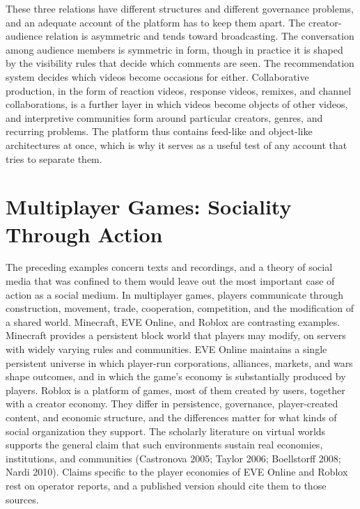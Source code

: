 \documentclass[11pt]{article}
\theoremstyle{remark}
\begin{document}
These three relations have different structures and different governance problems, and an adequate account of the platform has to keep them apart. The creator-audience relation is asymmetric and tends toward broadcasting. The conversation among audience members is symmetric in form, though in practice it is shaped by the visibility rules that decide which comments are seen. The recommendation system decides which videos become occasions for either. Collaborative production, in the form of reaction videos, response videos, remixes, and channel collaborations, is a further layer in which videos become objects of other videos, and interpretive communities form around particular creators, genres, and recurring problems. The platform thus contains feed-like and object-like architectures at once, which is why it serves as a useful test of any account that tries to separate them.

\section{Multiplayer Games: Sociality Through Action}

The preceding examples concern texts and recordings, and a theory of social media that was confined to them would leave out the most important case of action as a social medium. In multiplayer games, players communicate through construction, movement, trade, cooperation, competition, and the modification of a shared world. Minecraft, EVE Online, and Roblox are contrasting examples. Minecraft provides a persistent block world that players may modify, on servers with widely varying rules and communities. EVE Online maintains a single persistent universe in which player-run corporations, alliances, markets, and wars shape outcomes, and in which the game's economy is substantially produced by players. Roblox is a platform of games, most of them created by users, together with a creator economy. They differ in persistence, governance, player-created content, and economic structure, and the differences matter for what kinds of social organization they support. The scholarly literature on virtual worlds supports the general claim that such environments sustain real economies, institutions, and communities (Castronova 2005; Taylor 2006; Boellstorff 2008; Nardi 2010). Claims specific to the player economies of EVE Online and Roblox rest on operator reports, and a published version should cite them to those sources.
\end{document}
